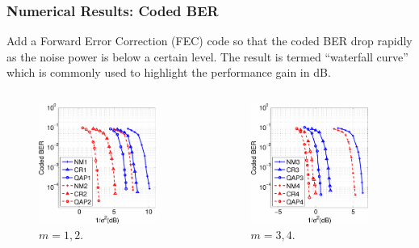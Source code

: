 \documentclass{beamer}
\begin{document}
\begin{frame}
  \frametitle{Numerical Results: Coded BER}
  Add a Forward Error Correction (FEC) code so that
  the coded BER drop rapidly as the noise power is below a certain level. The
  result is termed ``waterfall curve'' which is commonly used to highlight the
  performance gain in dB.
  \begin{columns}
    \begin{figure}
      \includegraphics[width=0.9\textwidth]{figs/waterfall_2M3M_64QAM.pdf}
      \caption{$m=1,2$.}
    \end{figure}
    
    \begin{figure}
      \includegraphics[width=0.9\textwidth]{figs/waterfall_4M5M_64QAM.pdf}
      \caption{$m=3,4$.}
    \end{figure}
  \end{columns}
\end{frame}
\end{document}
